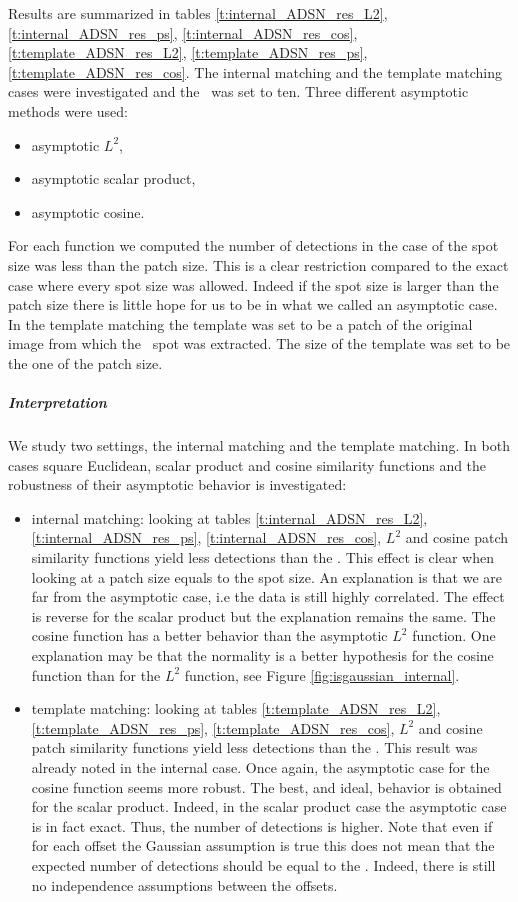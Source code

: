  Results are summarized in tables \ref{t:internal_ADSN_res_L2}, \ref{t:internal_ADSN_res_ps}, \ref{t:internal_ADSN_res_cos}, \ref{t:template_ADSN_res_L2}, \ref{t:template_ADSN_res_ps}, \ref{t:template_ADSN_res_cos}. The internal matching and the template matching cases were investigated and the \NFA \ was set to ten. Three different asymptotic methods were used:
 \begin{itemize}
 \item asymptotic $L^2$,
 \item asymptotic scalar product,
 \item asymptotic cosine.
 \end{itemize}
 For each function we computed the number of detections in the case of the spot size was less than the patch size. This is a clear restriction compared to the exact case where every spot size was allowed. Indeed if the spot size is larger than the patch size there is little hope for us to be in what we called an asymptotic case. In the template matching the template was set to be a patch of the original image from which the \ADSN \ spot was extracted. The size of the template was set to be the one of the patch size.
 \subparagraph{Interpretation} We study two settings, the internal matching and the template matching. In both cases square Euclidean, scalar product and cosine similarity functions and the robustness of their asymptotic behavior is investigated:
 \begin{itemize}
 \item internal matching: looking at tables \ref{t:internal_ADSN_res_L2}, \ref{t:internal_ADSN_res_ps}, \ref{t:internal_ADSN_res_cos}, $L^2$ and cosine patch similarity functions yield less detections than the \NFA . This effect is clear when looking at a patch size equals to the spot size. An explanation is that we are far from the asymptotic case, i.e the data is still highly correlated. The effect is reverse for the scalar product but the explanation remains the same. The cosine function has a better behavior than the asymptotic $L^2$ function. One explanation may be that the normality is a better hypothesis for the cosine function than for the $L^2$ function, see Figure \ref{fig:isgaussian_internal}.
 \item template matching: looking at tables \ref{t:template_ADSN_res_L2}, \ref{t:template_ADSN_res_ps}, \ref{t:template_ADSN_res_cos}, $L^2$ and cosine patch similarity functions yield less detections than the \NFA . This result was already noted in the internal case. Once again, the asymptotic case for the cosine function seems more robust. The best, and ideal, behavior is obtained for the scalar product. Indeed, in the scalar product case the asymptotic case is in fact exact. Thus, the number of detections is higher. Note that even if for each offset the Gaussian assumption is true this does not mean that the expected number of detections should be equal to the \NFA . Indeed, there is still no independence assumptions between the offsets.
 \end{itemize}
